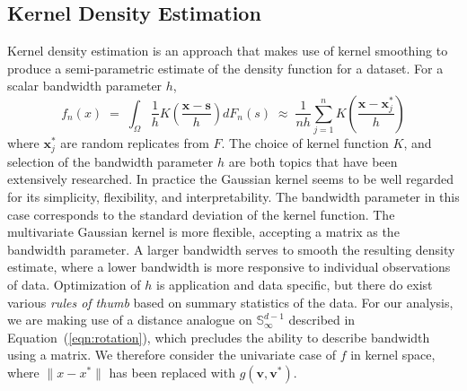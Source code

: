 
\subsection{Kernel Density Estimation}
Kernel density estimation is an approach that makes use of 
    kernel smoothing to produce a semi-parametric estimate of the density
    function for a dataset.  For a scalar bandwidth parameter $h$,
    \[
        f_n(x) \;=\; 
            \int_{\Omega}\frac{1}{h}
                K\left(\frac{ \bm{x} - \bm{s}}{h}\right)dF_n(s) \;\approx\;
            \frac{1}{nh}\sum_{j = 1}^n
                K\left(\frac{ \bm{x} - \bm{x}_j^{*}}{h}\right)
    \]
    where $\bm{x}_j^{*}$ are random replicates from $F$.  The choice of kernel function 
    $K$, and selection of the bandwidth parameter $h$ are both topics that have
    been extensively researched. In practice the Gaussian kernel seems to be 
    well regarded for its simplicity, flexibility, and interpretability.  The
    bandwidth parameter in this case corresponds to the standard deviation 
    of the kernel function.  The multivariate Gaussian kernel is more flexible,
    accepting a matrix as the bandwidth parameter.  A larger bandwidth serves 
    to smooth the resulting density estimate, where a lower bandwidth is more 
    responsive to individual observations of data.  Optimization of $h$ is 
    application and data specific, but there do exist various 
    \emph{rules of thumb} based on summary statistics of the data. For our 
    analysis, we are making use of a distance analogue on 
    $\mathbb{S}_{\infty}^{d-1}$ described in Equation~(\ref{eqn:rotation}), 
    which precludes the ability to describe bandwidth using a matrix.  We 
    therefore consider the univariate case of $f$ in kernel space, where 
    $\lVert x - x^*\rVert$ has been replaced with $g(\bm{v}, \bm{v}^*)$.

